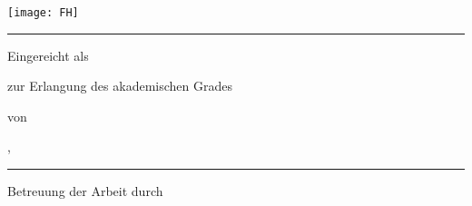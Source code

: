 \makeatletter
	\begin{titlepage}
		\centering
		\texttt{[image: FH]} \par
			\vskip 6mm
		\textsc{\Large \@coursetype}
			\vskip 2mm
		{\Large \@course}
			\vskip 0mm

		\rule{15cm}{0.3mm}

		    \vfill
		{\bfseries\LARGE \@title\par}
			\vfill

		Eingereicht als \textsc{\@doctype}
			\vskip 2mm

		zur Erlangung des akademischen Grades
			\vskip 6mm
		\@degree
			\vskip 6mm

		von
			\vskip 6mm
		{\bfseries\large \@author\par}
			\vskip 6mm

		\@location, {\large \@submonth\ \@subyear}
			\vskip 6mm

		\rule{15cm}{0.3mm}
			\vskip 5mm
		Betreuung der Arbeit durch
			\vskip 0mm
		\@supervisor
	\end{titlepage}
\makeatother
